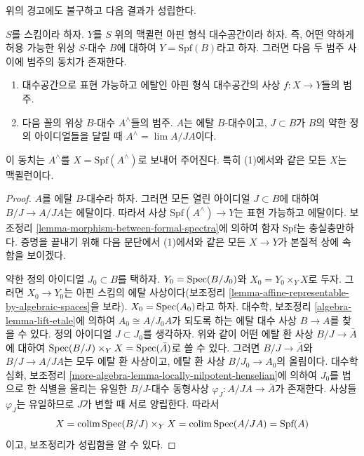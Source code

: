 \noindent
위의 경고에도 불구하고 다음 결과가 성립한다.

\begin{lemma}
\label{lemma-etale}
$S$를 스킴이라 하자. $Y$를 $S$ 위의 맥퀼런 아핀 형식
대수공간이라 하자. 즉, 어떤 약하게 허용 가능한 위상 $S$-대수
$B$에 대하여 $Y = \text{Spf}(B)$라고 하자. 그러면 다음 두 범주
사이에 범주의 동치가 존재한다.
\begin{enumerate}
\item 대수공간으로 표현 가능하고 에탈인 아핀 형식 대수공간의
사상 $f : X \to Y$들의 범주.
\item 다음 꼴의 위상 $B$-대수 $A^\wedge$들의 범주. $A$는 에탈
$B$-대수이고,
$J \subset B$가 $B$의 약한 정의 아이디얼들을 달릴 때
$A^\wedge = \lim A/JA$이다.
\end{enumerate}
이 동치는 $A^\wedge$를 $X = \text{Spf}(A^\wedge)$로 보내어
주어진다. 특히 (1)에서와 같은 모든 $X$는 맥퀼런이다.
\end{lemma}

\begin{proof}
$A$를 에탈 $B$-대수라 하자. 그러면 모든 열린 아이디얼
$J \subset B$에 대하여 $B/J \to A/JA$는 에탈이다. 따라서 사상
$\text{Spf}(A^\wedge) \to Y$는 표현 가능하고 에탈이다.
보조정리 \ref{lemma-morphism-between-formal-spectra}에 의하여
함자 $\text{Spf}$는 충실충만하다. 증명을 끝내기 위해 다음 문단에서
(1)에서와 같은 모든 $X \to Y$가 본질적 상에 속함을 보이겠다.

\medskip\noindent
약한 정의 아이디얼 $J_0 \subset B$를 택하자.
$Y_0 = \mathop{\mathrm{Spec}}(B/J_0)$와 $X_0 = Y_0 \times_Y X$로 두자. 그러면
$X_0 \to Y_0$는 아핀 스킴의 에탈 사상이다(보조정리
\ref{lemma-affine-representable-by-algebraic-spaces}을 보라).
$X_0 = \mathop{\mathrm{Spec}}(A_0)$라고 하자. 대수학, 보조정리
\ref{algebra-lemma-lift-etale}에 의하여
$A_0 \cong A/J_0A$가 되도록 하는 에탈 대수 사상 $B \to A$를
찾을 수 있다. 정의 아이디얼 $J \subset J_0$를 생각하자. %
위와 같이 어떤 에탈 환 사상 $B/J \to \bar A$에 대하여
$\mathop{\mathrm{Spec}}(B/J) \times_Y X = \mathop{\mathrm{Spec}}(\bar A)$로 쓸 수 있다.
그러면 $B/J \to \bar A$와 $B/J \to A/JA$는 모두 에탈 환 사상이고,
에탈 환 사상 $B/J_0 \to A_0$의 올림이다. 대수학 심화, 보조정리
\ref{more-algebra-lemma-locally-nilpotent-henselian}에 의하여
$J_0$를 법으로 한 식별을 올리는 유일한 $B/J$-대수 동형사상
$\varphi_J : A/JA \to \bar A$가 존재한다. 사상들 $\varphi_J$는
유일하므로 $J$가 변할 때 서로 양립한다. 따라서
$$
X = \colim \Spec(B/J) \times_Y X = \colim \Spec(A/JA) = \text{Spf}(A) %
$$
이고, 보조정리가 성립함을 알 수 있다.
\end{proof}


